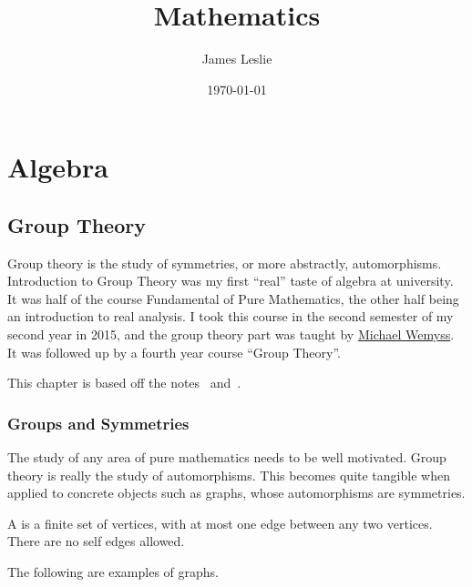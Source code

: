 \documentclass[12pt]{report}
\title{Mathematics}
\author{James Leslie}
\date{\today}
\begin{document}
\listoftodos{}
\maketitle
\tableofcontents


\part{Algebra}
\chapter{Group Theory}\label{cha:intr-group-theory}
Group theory is the study of symmetries, or more abstractly, automorphisms.
%
Introduction to Group Theory was my first ``real'' taste of algebra at university.
%
It was half of the course Fundamental of Pure Mathematics, the other half being an introduction to real analysis.
%
I took this course in the second semester of my second year in 2015, and the group theory part was taught by \href{https://www.maths.gla.ac.uk/~mwemyss/}{Michael Wemyss}.
%
It was followed up by a fourth year course ``Group Theory''.


This chapter is based off the notes~\cite{wemyss2015grouptheory} and~\cite{lanini2017grouptheory}.


\section{Groups and Symmetries}
The study of any area of pure mathematics needs to be well motivated.
%
Group theory is really the study of automorphisms.
%
This becomes quite tangible when applied to concrete objects such as graphs, whose automorphisms are symmetries.


\begin{definition}\cite[Definition 1.1.1]{wemyss2015grouptheory}\label{def:intr-group-theory:graph}
  A  is a finite set of vertices, with at most one edge between any two vertices.
  There are no self edges allowed.
\end{definition}

\begin{example}
  The following are examples of graphs.

\end{example}
\end{document}
